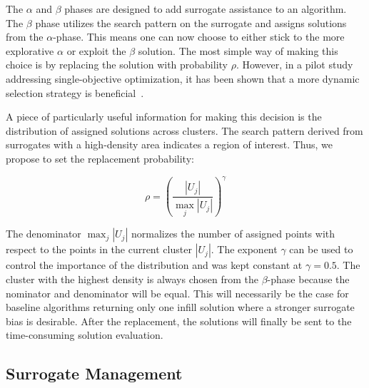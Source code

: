 \documentclass[journal]{IEEEtran}
\begin{document}
The $\alpha$ and $\beta$ phases are designed to add surrogate assistance to an algorithm. The $\beta$ phase utilizes the search pattern on the surrogate and assigns solutions from the $\alpha$-phase. This means one can now choose to either stick to the more explorative $\alpha$ or exploit the $\beta$ solution. 
The most simple way of making this choice is by replacing the solution with probability $\rho$. 
However, in a pilot study addressing single-objective optimization, it has been shown that a more dynamic selection strategy is beneficial~\cite{2021-blankjul-psaf}. 

A piece of particularly useful information for making this decision is the distribution of assigned solutions across clusters.
The search pattern derived from surrogates with a high-density area indicates a region of interest. Thus, we propose to set the replacement probability:

\begin{equation}
    \rho = \left( \frac{|U_j|}{\max_j |U_j|} \right) ^ \gamma
\end{equation}


The denominator $\max_j |U_j|$ normalizes the number of assigned points with respect to the points in the current cluster $|U_j|$. The exponent $\gamma$ can be used to control the importance of the distribution and was kept constant at  $\gamma = 0.5$. 
The cluster with the highest density is always chosen from the $\beta$-phase because the nominator and denominator will be equal. 
This will necessarily be the case for baseline algorithms returning only one infill solution where a stronger surrogate bias is desirable. 
After the replacement, the solutions will finally be sent to the time-consuming solution evaluation.


\subsection{Surrogate Management}
\end{document}
